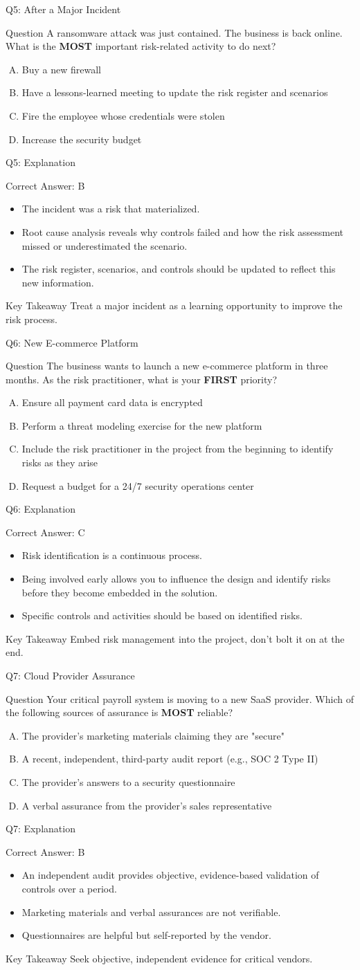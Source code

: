 \documentclass[aspectratio=169]{beamer}
\newcommand{\hq}[7]{%
	\begin{frame}{Q#1: #2}
		\begin{block}{Question}
			#3
		\end{block}
		\begin{enumerate}[(A)]
			#4
		\end{enumerate}
	\end{frame}
	\begin{frame}{Q#1: Explanation}
		\begin{block}{Correct Answer: #5}
			\begin{itemize}
				#6
			\end{itemize}
		\end{block}
		\begin{alertblock}{Key Takeaway}
			#7
		\end{alertblock}
	\end{frame}
}
\begin{document}
	\hq{5}{After a Major Incident}
	{A ransomware attack was just contained. The business is back online. What is the \textbf{MOST} important risk-related activity to do next?}
	{\item Buy a new firewall
		\item Have a lessons-learned meeting to update the risk register and scenarios
		\item Fire the employee whose credentials were stolen
		\item Increase the security budget}
	{B}
	{\item The incident was a risk that materialized.
		\item Root cause analysis reveals why controls failed and how the risk assessment missed or underestimated the scenario.
		\item The risk register, scenarios, and controls should be updated to reflect this new information.}
	{Treat a major incident as a learning opportunity to improve the risk process.}
	
	\hq{6}{New E-commerce Platform}
	{The business wants to launch a new e-commerce platform in three months. As the risk practitioner, what is your \textbf{FIRST} priority?}
	{\item Ensure all payment card data is encrypted
		\item Perform a threat modeling exercise for the new platform
		\item Include the risk practitioner in the project from the beginning to identify risks as they arise
		\item Request a budget for a 24/7 security operations center}
	{C}
	{\item Risk identification is a continuous process.
		\item Being involved early allows you to influence the design and identify risks before they become embedded in the solution.
		\item Specific controls and activities should be based on identified risks.}
	{Embed risk management into the project, don't bolt it on at the end.}
	
	\hq{7}{Cloud Provider Assurance}
	{Your critical payroll system is moving to a new SaaS provider. Which of the following sources of assurance is \textbf{MOST} reliable?}
	{\item The provider's marketing materials claiming they are "secure"
		\item A recent, independent, third-party audit report (e.g., SOC 2 Type II)
		\item The provider's answers to a security questionnaire
		\item A verbal assurance from the provider's sales representative}
	{B}
	{\item An independent audit provides objective, evidence-based validation of controls over a period.
		\item Marketing materials and verbal assurances are not verifiable.
		\item Questionnaires are helpful but self-reported by the vendor.}
	{Seek objective, independent evidence for critical vendors.}
	
\end{document}

